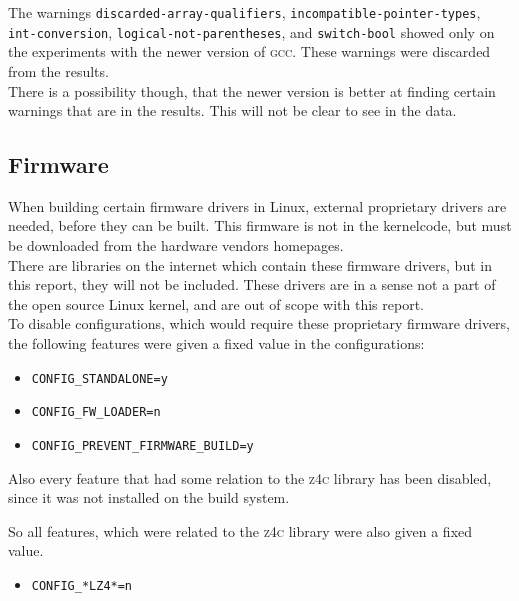 \documentclass[a4paper,11pt]{report}
\newcommand{\textcode}[1]{\fboxsep=1pt\texttt{\colorbox{gray!20}{#1}}}
\begin{document}
The warnings \texttt{discarded-array-qualifiers}, 
\texttt{incompatible-pointer-types}, \texttt{int-conversion}, 
\texttt{logical-not-parentheses}, and \texttt{switch-bool} showed only on the 
experiments with the newer version of \textsc{gcc}. These warnings were 
discarded from the results.
\\

There is a possibility though, that the newer version is better at finding 
certain warnings that are in the results. This will not be clear to see in the 
data.



            \subsection{Firmware}
When building certain firmware drivers in Linux, external proprietary drivers 
are needed, before they can be built. This firmware is not in the kernelcode, 
but must be downloaded from the hardware vendors homepages.
\\

There are libraries on the internet which contain these firmware drivers, but 
in this report, they will not be included. These drivers are in a sense not a 
part of the open source Linux kernel, and are out of scope with this report.
\\

To disable configurations, which would require these proprietary firmware 
drivers, the following features were given a fixed value in the configurations:

\begin{itemize}
    \item \textcode{CONFIG\_STANDALONE=y}
    \item \textcode{CONFIG\_FW\_LOADER=n}
    \item \textcode{CONFIG\_PREVENT\_FIRMWARE\_BUILD=y}
\end{itemize}


Also every feature that had some relation to the \textsc{z4c} library has been 
disabled, since it was not installed on the build system.

So all features, which were related to the \textsc{z4c} library were also given 
a fixed value.

\begin{itemize}
    \item \textcode{CONFIG\_*LZ4*=n}
\end{itemize}
\end{document}
